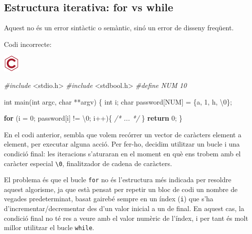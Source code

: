 \documentclass[
]{book}
\newenvironment{Shaded}{\begin{snugshade}}{\end{snugshade}}
\newcommand{\CharTok}[1]{\textcolor[rgb]{0.31,0.60,0.02}{#1}}
\newcommand{\CommentTok}[1]{\textcolor[rgb]{0.56,0.35,0.01}{\textit{#1}}}
\newcommand{\ControlFlowTok}[1]{\textcolor[rgb]{0.13,0.29,0.53}{\textbf{#1}}}
\newcommand{\DataTypeTok}[1]{\textcolor[rgb]{0.13,0.29,0.53}{#1}}
\newcommand{\DecValTok}[1]{\textcolor[rgb]{0.00,0.00,0.81}{#1}}
\newcommand{\ImportTok}[1]{#1}
\newcommand{\NormalTok}[1]{#1}
\newcommand{\PreprocessorTok}[1]{\textcolor[rgb]{0.56,0.35,0.01}{\textit{#1}}}
\begin{document}
\hypertarget{estructura-iterativa-for-vs-while}{%
\subsection{Estructura iterativa: for vs while}\label{estructura-iterativa-for-vs-while}}

Aquest no és un error sintàctic o semàntic, sinó un error de disseny freqüent.

Codi incorrecte:

\includegraphics{./img/c_err.png}

\begin{Shaded}
\begin{Highlighting}[]
\PreprocessorTok{\#include }\ImportTok{\textless{}stdio.h\textgreater{}}
\PreprocessorTok{\#include }\ImportTok{\textless{}stdbool.h\textgreater{}}
\PreprocessorTok{\#define NUM 10}

\DataTypeTok{int}\NormalTok{ main(}\DataTypeTok{int}\NormalTok{ argc, }\DataTypeTok{char}\NormalTok{ **argv) \{}
    \DataTypeTok{int}\NormalTok{ i;}
    \DataTypeTok{char}\NormalTok{ password[NUM] = \{}\CharTok{\textquotesingle{}a\textquotesingle{}}\NormalTok{, }\CharTok{\textquotesingle{}1\textquotesingle{}}\NormalTok{, }\CharTok{\textquotesingle{}h\textquotesingle{}}\NormalTok{, }\CharTok{\textquotesingle{}\textbackslash{}0\textquotesingle{}}\NormalTok{\};}
    
    \ControlFlowTok{for}\NormalTok{ (i = }\DecValTok{0}\NormalTok{; password[i] != }\CharTok{\textquotesingle{}\textbackslash{}0\textquotesingle{}}\NormalTok{; i++)\{}
        \CommentTok{/* ... */}
\NormalTok{    \}}
    \ControlFlowTok{return} \DecValTok{0}\NormalTok{;}
\NormalTok{\}}
\end{Highlighting}
\end{Shaded}

En el codi anterior, sembla que volem recórrer un vector de caràcters element a element, per executar alguna acció. Per fer-ho, decidim utilitzar un bucle i una condició final: les iteracions s'aturaran en el moment en què ens trobem amb el caràcter especial \texttt{\textquotesingle{}\textbackslash{}0\textquotesingle{}}, finalitzador de cadena de caràcters.

El problema és que el bucle \texttt{for} no és l'estructura més indicada per resoldre aquest algorisme, ja que està pensat per repetir un bloc de codi un nombre de vegades predeterminat, basat gairebé sempre en un índex (\texttt{i}) que s'ha d'incrementar/decrementar des d'un valor inicial a un de final. En aquest cas, la condició final no té res a veure amb el valor numèric de l'índex, i per tant és molt millor utilitzar el bucle \texttt{while}.
\end{document}
